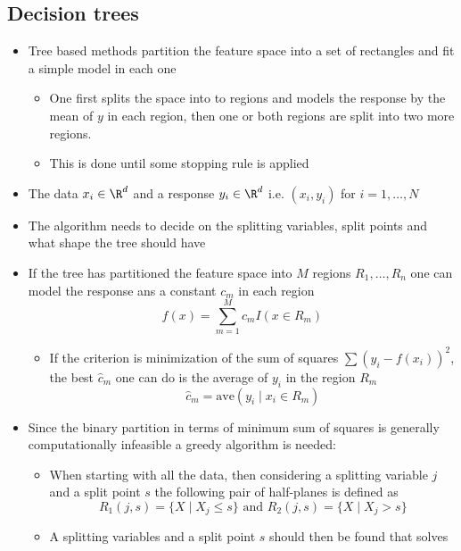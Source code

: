\documentclass[a4, english]{article}
\begin{document}
\subsection{Decision trees}
\begin{itemize}
  \item Tree based methods partition the feature space into a set of rectangles and fit a simple model in each one 
  \begin{itemize}
    \item One first splits the space into to regions and models the response by the mean of $y$ in each region, then one or both regions are split into two more regions.
    \item This is done until some stopping rule is applied 
  \end{itemize}
	\item The data $x_i \in \R^d$ and a response $y_i \in \R^d$ i.e. $(x_i, y_i)$ for $i=1,\dots,N$ 
  \item The algorithm needs to decide on the splitting variables, split points and what shape the tree should have
  \item If the tree has partitioned the feature space into $M$ regions $R_1, \dots, R_n$ one can model the response ans a constant $c_m$ in each region   
\begin{equation*}
  f(x) = \sum_{m=1}^Mc_mI(x \in R_m)
\end{equation*}
  \begin{itemize}
	  \item If the criterion is minimization of the sum of squares $\sum(y_i-f(x_i))^2$, the best $\hat c_m$ one can do is the average of $y_i$ in the region $R_m$  
\begin{equation*}
  \hat c_m = \text{ave}(y_i \mid x_i \in R_m )
\end{equation*}
  \end{itemize}
  \item Since the binary partition in terms of minimum sum of squares is generally computationally infeasible a greedy algorithm is needed:
  \begin{itemize}
  	\item When starting with all the data, then considering a splitting variable $j$ and a split point $s$ the following pair of half-planes is defined as
\begin{equation*}
  R_1(j,s) = \{X \mid X_j \leq s\} \text{ and } R_2(j,s) = \{X \mid X_j > s\}
\end{equation*}
    \item A splitting variables and a split point $s$ should then be found that solves

\end{itemize}
\end{itemize}
\end{document}
